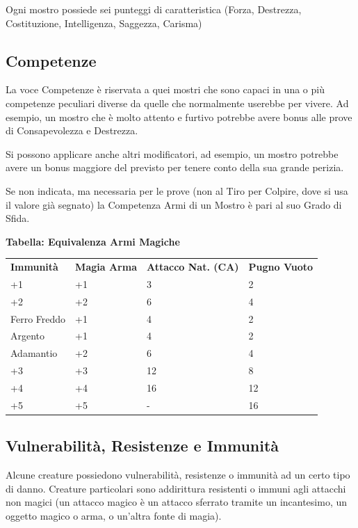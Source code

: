 \begin{multicols}{2}
Ogni mostro possiede sei punteggi di caratteristica (Forza, Destrezza, Costituzione, Intelligenza, Saggezza, Carisma)

\subsection{Competenze}

La voce Competenze è riservata a quei mostri che sono capaci in una o più competenze peculiari diverse da quelle che normalmente userebbe per vivere. Ad esempio, un mostro che è molto attento e furtivo potrebbe avere bonus alle prove di Consapevolezza e Destrezza.

Si possono applicare anche altri modificatori, ad esempio, un mostro potrebbe avere un bonus maggiore del previsto per tenere conto della sua grande perizia.

Se non indicata, ma necessaria per le prove (non al Tiro per Colpire, dove si usa il valore già segnato) la Competenza Armi di un Mostro è pari al suo Grado di Sfida.

\medskip

\textbf{Tabella: Equivalenza Armi Magiche}\label{equivalenzaarmimagiche}\hypertarget{equivalenzaarmimagiche}{}

\medskip

\begin{tabular}{lp{}p{}p{}}
	\toprule
	\textbf{Immunità} & \textbf{Magia Arma} & \textbf{Attacco Nat. (CA)}& \textbf{Pugno Vuoto}\\
	+1 & +1 & 3& 2\\
	+2 & +2 & 6& 4\\
	Ferro Freddo & +1 & 4& 2\\
	Argento & +1 & 4& 2\\
	Adamantio & +2 & 6& 4\\
	+3 & +3 & 12& 8\\
	+4 & +4 & 16& 12\\
	+5 & +5 & - & 16
\end{tabular}


\subsection{Vulnerabilità, Resistenze e Immunità}\label{vulnerabilitaresistenze}
Alcune creature possiedono vulnerabilità, resistenze o immunità ad un certo tipo di danno. Creature particolari sono addirittura resistenti o immuni agli attacchi non magici (un attacco magico è un attacco sferrato tramite un incantesimo, un oggetto magico o arma, o un'altra fonte di magia).


\end{multicols}
